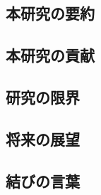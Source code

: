 
\subsection{本研究の要約}\label{subsec:summary}


\subsection{本研究の貢献}\label{subsec:contributions}


\subsection{研究の限界}\label{subsec:limitations-recap}


\subsection{将来の展望}\label{subsec:future-work}


\subsection{結びの言葉}\label{subsec:closing}

